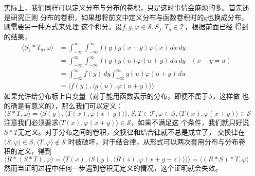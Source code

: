 \documentclass{ctexbook}
\begin{document}
实际上，我们同样可以定义分布与分布的卷积，只是这时事情会麻烦的多。首先还是研究正则
分布的卷积，如果想将前文中定义分布与函数卷积时的g也换成分布，则需要另一种方式来处理
这个积分。设$f,g,\varphi\in\mathcal{S} ,S_f,T_g\in\mathcal{T} $，根据前面已经
得到的结果，
\begin{align*}
    \langle S_f *T_g,\varphi\rangle & =\int_{-\infty}^{\infty}\int_{-\infty}^{\infty}f(y)g(x-y)\varphi(x)\,dx\,dy           \\
                                    & =\int_{-\infty}^{\infty}\int_{-\infty}^{\infty}f(y)g(u)\varphi(u+y)\,du\,dy & (x-y=u) \\
                                    & =\int_{-\infty}^{\infty}f(y)\,dy\int_{-\infty}^{\infty}g(u)\varphi(u+y)\,du           \\
                                    & =\langle f(y),\langle g(u),\varphi(u+y)\rangle\rangle
\end{align*}
如果允许给分布标上自变量（对于能用函数表示的分布，即便不属于$\mathcal{S} $，这样做
也的确是有意义的），那么我们可以定义：
\begin{equation}
    \langle S*T,\varphi\rangle=\langle S(y),\langle T(x),\varphi(x+y)\rangle\rangle,S,T\in\mathcal{T} ,\varphi\in\mathcal{S} ,\langle T(x),\varphi(x+y)\rangle\in\mathcal{S}
\end{equation}
注意我们必须要求$\langle T(x),\varphi(x+y)\rangle\in\mathcal{S}$，如果不满足这
个条件，我们就只好说$S*T$无定义。对于分布之间的卷积，交换律和结合律就不总是成立了，
交换律在$\langle S,\varphi\rangle\in\mathcal{S} ,\langle T,\varphi\rangle\notin\mathcal{S}$
时被破坏，对于结合律，从形式可以两次套用分布与分布卷积的定义，得到
\begin{equation*}
    \langle R*(S*T),\varphi\rangle=\langle T(x),\langle S(y),\langle R(z),\varphi(x+y+z)\rangle\rangle\rangle=\langle (R*S)*T,\varphi\rangle
\end{equation*}
然而当证明过程中任何一步遇到卷积无定义的情况，这个证明就会失效。
\end{document}
